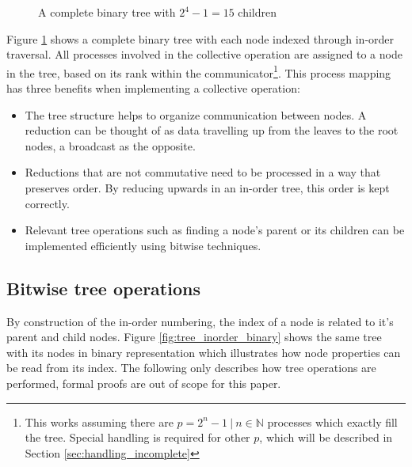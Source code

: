 \documentclass[twoside,twocolumn,hidelinks]{article}
\begin{document}
\begin{figure}
      \centering
      \caption{A complete binary tree with $2^4-1 = 15$ children}
      \label{fig:tree_inorder}
\end{figure}

Figure \ref{fig:tree_inorder} shows a complete binary tree with each node indexed through in-order traversal. All processes involved in the collective operation are assigned to a node in the tree, based on its rank within the communicator\footnote{This works assuming there are $p = 2^n-1 \:|\: n \in \mathbb{N}$ processes which exactly fill the tree. Special handling is required for other $p$, which will be described in Section \ref{sec:handling_incomplete}}. This process mapping has three benefits when implementing a collective operation:
\begin{itemize}
      \item The tree structure helps to organize communication between nodes. A reduction can be thought of as data travelling up from the leaves to the root nodes, a broadcast as the opposite.
      \item Reductions that are not commutative need to be processed in a way that preserves order. By reducing upwards in an in-order tree, this order is kept correctly.
      \item Relevant tree operations such as finding a node's parent or its children can be implemented efficiently using bitwise techniques.
\end{itemize}

\subsection{Bitwise tree operations}\label{sec:bitwise_tree_operations}
By construction of the in-order numbering, the index of a node is related to it's parent and child nodes. Figure \ref{fig:tree_inorder_binary} shows the same tree with its nodes in binary representation which illustrates how node properties can be read from its index. The following only describes how tree operations are performed, formal proofs are out of scope for this paper.
\end{document}
